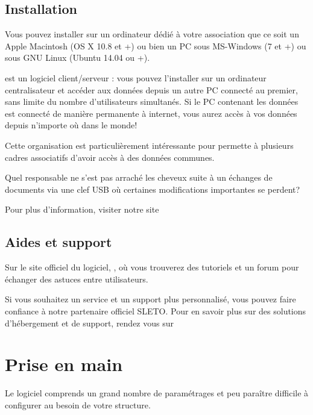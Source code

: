 \documentclass[a4paper,10pt,oneside,french]{sphinxmanual}
\begin{document}
\subsection{Installation}
\label{\detokenize{pro/presentation:installation}}
Vous pouvez installer  sur un ordinateur dédié à votre association que ce soit un Apple Macintosh (OS X 10.8 et +) ou bien un PC sous MS-Windows (7 et +) ou sous GNU Linux (Ubuntu 14.04 ou +).

 est un logiciel client/serveur : vous pouvez l’installer sur un ordinateur centralisateur et accéder aux données depuis un autre PC connecté au premier, sans limite du nombre d’utilisateurs simultanés.
Si le PC contenant les données est connecté de manière permanente à internet, vous aurez accès à vos données depuis n’importe où dans le monde!

Cette organisation est particulièrement intéressante pour permette à plusieurs cadres associatifs d’avoir accès à des données communes.

Quel responsable ne s’est pas arraché les cheveux suite à un échanges de documents via une clef USB où certaines modifications importantes se perdent?

Pour plus d’information, visiter notre site 


\subsection{Aides et support}
\label{\detokenize{pro/presentation:aides-et-support}}
Sur le site officiel du logiciel, , où vous trouverez des tutoriels et un forum pour échanger des astuces entre utilisateurs.

Si vous souhaitez un service et un support plus personnalisé, vous pouvez faire confiance à notre partenaire officiel SLETO.
Pour en savoir plus sur des solutions d’hébergement et de support, rendez vous sur 


\section{Prise en main}
\label{\detokenize{pro/first_step:prise-en-main}}\label{\detokenize{pro/first_step::doc}}
Le logiciel  comprends un grand nombre de paramétrages et peu paraître difficile à configurer au besoin de votre structure.
\end{document}
